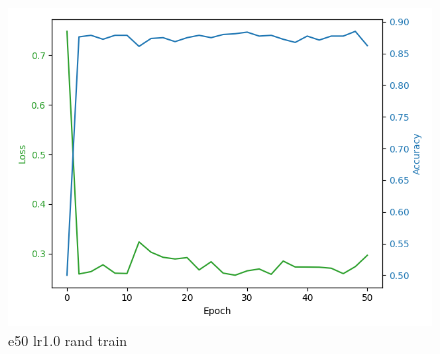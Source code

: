 \documentclass[8pt]{article}
\begin{document}
\begin{figure}[H]
    \begin{minipage}{0.32\textwidth}
        \centering
        \includegraphics[width=\textwidth]{../Prob4/out/1024_173617/e50_lr1_btz16_random/training_process.png}
        \caption{e50 lr1.0 rand train}
        \label{fig:e50 lr1.0 rand train}
    \end{minipage}
\end{figure}
\end{document}
